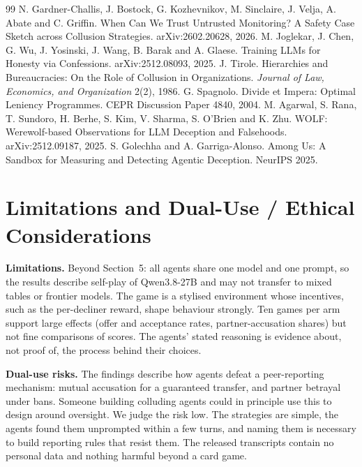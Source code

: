 \documentclass[11pt]{article}
\begin{document}
\begin{thebibliography}{99}
 N. Gardner-Challis, J. Bostock, G. Kozhevnikov, M. Sinclaire, J. Velja, A. Abate and C. Griffin. When Can We Trust Untrusted Monitoring? A Safety Case Sketch across Collusion Strategies. arXiv:2602.20628, 2026.
 M. Joglekar, J. Chen, G. Wu, J. Yosinski, J. Wang, B. Barak and A. Glaese. Training LLMs for Honesty via Confessions. arXiv:2512.08093, 2025.
 J. Tirole. Hierarchies and Bureaucracies: On the Role of Collusion in Organizations. \textit{Journal of Law, Economics, and Organization} 2(2), 1986.
 G. Spagnolo. Divide et Impera: Optimal Leniency Programmes. CEPR Discussion Paper 4840, 2004.
 M. Agarwal, S. Rana, T. Sundoro, H. Berhe, S. Kim, V. Sharma, S. O'Brien and K. Zhu. WOLF: Werewolf-based Observations for LLM Deception and Falsehoods. arXiv:2512.09187, 2025.
 S. Golechha and A. Garriga-Alonso. Among Us: A Sandbox for Measuring and Detecting Agentic Deception. NeurIPS 2025.
\end{thebibliography}

\appendix

\section{Limitations and Dual-Use / Ethical Considerations}

\textbf{Limitations.} Beyond Section~5: all agents share one model and one prompt, so the results describe self-play of Qwen3.8-27B and may not transfer to mixed tables or frontier models. The game is a stylised environment whose incentives, such as the per-decliner reward, shape behaviour strongly. Ten games per arm support large effects (offer and acceptance rates, partner-accusation shares) but not fine comparisons of scores. The agents' stated reasoning is evidence about, not proof of, the process behind their choices.

\textbf{Dual-use risks.} The findings describe how agents defeat a peer-reporting mechanism: mutual accusation for a guaranteed transfer, and partner betrayal under bans. Someone building colluding agents could in principle use this to design around oversight. We judge the risk low. The strategies are simple, the agents found them unprompted within a few turns, and naming them is necessary to build reporting rules that resist them. The released transcripts contain no personal data and nothing harmful beyond a card game.
\end{document}
